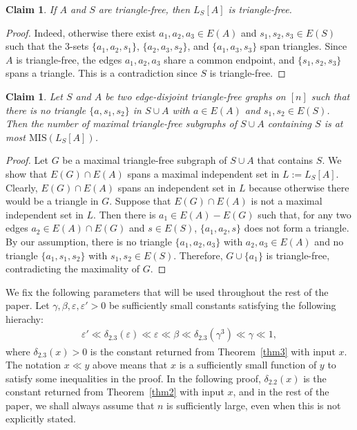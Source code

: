 \documentclass[12pt]{article}
\newtheorem{claim}[theorem]{Claim}
\theoremstyle{definition}
\theoremstyle{definition}
\theoremstyle{definition}
\theoremstyle{definition}
\theoremstyle{definition}
\theoremstyle{definition}
\theoremstyle{definition}
\newcommand{\ep}{\varepsilon}
\newcommand{\de}{\delta}
\newcommand{\ga}{\gamma}
\newcommand{\3}{\bf{3}}
\newcommand{\MIS}{\mathrm{MIS}}
\begin{document}
\begin{claim}\label{cl_triangle_free}
If $A$ and $S$ are triangle-free, then $L_S[A]$ is triangle-free.
\end{claim}
\begin{proof}
Indeed, otherwise there exist $a_1,a_2,a_3\in E(A)$ and $s_1,s_2,s_3\in E(S)$ such that the $3$-sets $\{a_1,a_2,s_1\}$, $\{a_2,a_3,s_2\}$, and $\{a_1,a_3,s_3\}$ span triangles. Since $A$ is triangle-free, the edges $a_1,a_2,a_3$ share a common endpoint, and $\{s_1,s_2,s_3\}$ spans a triangle. This is a contradiction since $S$ is triangle-free. 
\end{proof}

\begin{claim}\label{cl_MIS}
Let $S$ and $A$ be two edge-disjoint triangle-free graphs on $[n]$ such that there is no triangle $\{a,s_1,s_2\}$ in $S\cup A$ with $a\in E(A)$ and $s_1, s_2\in E(S)$. Then the number of maximal triangle-free subgraphs of $S\cup A$ containing $S$ is at most $\MIS(L_S[A])$.
\end{claim}

\begin{proof}
Let $G$ be a maximal triangle-free subgraph of $S\cup A$ that contains $S$. We show that $E(G)\cap E(A)$ spans a maximal independent set in $L:=L_S[A]$. Clearly, $E(G)\cap E(A)$ spans an independent set in $L$ because otherwise there would be a triangle in $G$. Suppose that $E(G)\cap E(A)$ is not a maximal independent set in $L$. Then there is $a_1\in E(A)- E(G)$ such that, for any two edges $a_2\in E(A)\cap E(G)$ and $s\in E(S)$, $\{a_1,a_2,s\}$ does not form a triangle. By our assumption, there is no triangle $\{a_1,a_2,a_3\}$ with $a_2,a_3\in E(A)$ and no triangle $\{a_1,s_1,s_2\}$ with $s_1,s_2\in E(S)$. Therefore, $G\cup \{a_1\}$ is triangle-free, contradicting the maximality of $G$.
\end{proof}

We fix the following parameters that will be used throughout the rest of the paper. Let $\ga,\beta,\ep,\ep'>0$ be sufficiently small constants satisfying the following hierachy:
\begin{eqnarray}\label{eq-para}
\ep'\ll\de_{2.3}(\ep)\ll\ep\ll\beta\ll\de_{2.3}(\ga^3)\ll\ga\ll 1,
\end{eqnarray}
where $\de_{2.3}(x)>0$ is the constant returned from Theorem~\ref{thm3} with input $x$. The notation $x\ll y$ above means that $x$ is a sufficiently small function of $y$ to satisfy some inequalities in the proof. In the following proof, $\de_{2.2}(x)$ is  the constant returned from Theorem~\ref{thm2} with input $x$, and in the rest of the paper, we shall always assume that $n$ is sufficiently large, even when this is not explicitly stated.
\end{document}
